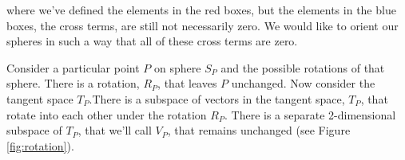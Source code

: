 \documentclass[11pt,table]{article}
\begin{document}
where we've defined the elements in the red boxes, but the elements in the blue boxes, the cross terms, are still not necessarily zero. We would like to orient our spheres in such a way that all of these cross terms are zero.

Consider a particular point $P$ on sphere $S_P$ and the possible rotations of that sphere. There is a rotation, $R_P$, that leaves $P$ unchanged. Now consider the tangent space $T_P$.There is a subspace of vectors in the tangent space, $T_P$, that rotate into each other under the rotation $R_P$. There is a separate 2-dimensional subspace of $T_P$, that we'll call $V_P$, that remains unchanged (see Figure \ref{fig:rotation}).

\begin{figure}[!h]
  \centering
  \begin{tikzpicture}[x=0.75pt,y=0.75pt,yscale=-.75,xscale=.75]


\end{tikzpicture}
\end{figure}
\end{document}
